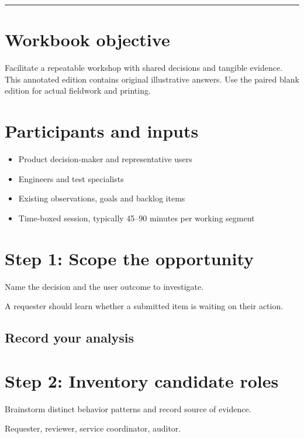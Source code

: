 \documentclass[11pt,letterpaper]{article}
\begin{document}
\tableofcontents\medskip\noindent\rule{\linewidth}{0.4pt}\medskip
\section{Workbook objective}
Facilitate a repeatable workshop with shared decisions and tangible evidence. This annotated edition contains original illustrative answers. Use the paired blank edition for actual fieldwork and printing.

\section{Participants and inputs}
\begin{itemize}[leftmargin=*,itemsep=2pt]
\item Product decision-maker and representative users
\item Engineers and test specialists
\item Existing observations, goals and backlog items
\item Time-boxed session, typically 45–90 minutes per working segment
\end{itemize}
\section{Step 1: Scope the opportunity}
Name the decision and the user outcome to investigate.

\begin{tcolorbox}[colback=tealback,colframe=navy,title={Illustration},breakable]
A requester should learn whether a submitted item is waiting on their action.

\end{tcolorbox}
\subsection{Record your analysis}
\section{Step 2: Inventory candidate roles}
Brainstorm distinct behavior patterns and record source of evidence.

\begin{tcolorbox}[colback=tealback,colframe=navy,title={Illustration},breakable]
Requester, reviewer, service coordinator, auditor.

\end{tcolorbox}
\end{document}
